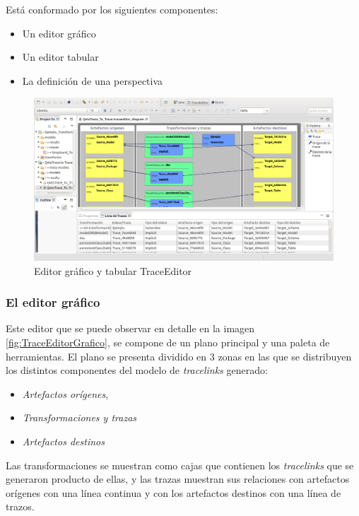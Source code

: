 \documentclass[a4paper,12pt,oneside,spanish]{book}
\begin{document}
Está conformado por los siguientes componentes:

\begin{itemize}
\item Un editor gráfico
\item Un editor tabular
\item La definición de una perspectiva 
\end{itemize}


\begin{figure}[hbtp]
\centering
\includegraphics[scale=.29]{./img/TraceEditorEjemplo}
\caption{Editor gráfico y tabular TraceEditor}
\label{fig:TraceEditorEjemplo}
\end{figure}


\subsubsection{El editor gráfico}

Este editor que se puede observar en detalle en la imagen \ref{fig:TraceEditorGrafico}, se compone de un plano principal y una paleta de herramientas. El plano se presenta dividido en 3 zonas en las que se distribuyen los distintos componentes del modelo de \textit{tracelinks} generado:

\begin{itemize}
\item \textsf{\textit{Artefactos orígenes}}, 
\item \textsf{\textit{Transformaciones y trazas}}
\item \textsf{\textit{Artefactos destinos}} 
\end{itemize} 

Las transformaciones se muestran como cajas que contienen los \textit{tracelinks} que se generaron producto de ellas, y las trazas muestran sus relaciones con artefactos orígenes con una línea continua y con los artefactos destinos con una línea de trazos.
\end{document}
